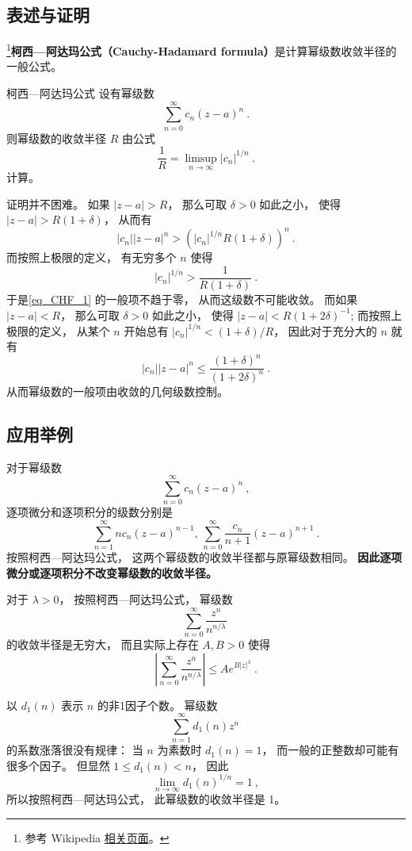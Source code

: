 

\subsection{表述与证明}

\footnote{参考 Wikipedia \href{https://en.wikipedia.org/wiki/Cauchy-Hadamard_theorem}{相关页面}。}\textbf{柯西—阿达玛公式（Cauchy-Hadamard formula）}是计算幂级数收敛半径的一般公式。

\begin{theorem}{柯西—阿达玛公式}
设有幂级数
\begin{equation}\label{eq_CHF_1}
\sum_{n=0}^\infty c_n(z-a)^n~.
\end{equation}
则幂级数的收敛半径 $R$ 由公式
$$
\frac{1}{R}=\limsup_{n\to\infty}|c_n|^{1/n}~.
$$
计算。
\end{theorem}
证明并不困难。 如果 $|z-a|>R$， 那么可取 $\delta>0$ 如此之小， 使得 $|z-a|>R(1+\delta)$， 从而有
$$
|c_n||z-a|^n>(|c_n|^{1/n}R(1+\delta))^n~.
$$
而按照上极限的定义， 有无穷多个 $n$ 使得
$$
|c_n|^{1/n}>\frac{1}{R(1+\delta)}~.
$$
于是\autoref{eq_CHF_1} 的一般项不趋于零， 从而这级数不可能收敛。 而如果 $|z-a|<R$， 那么可取 $\delta>0$ 如此之小， 使得 $|z-a|<R(1+2\delta)^{-1}$; 而按照上极限的定义， 从某个 $n$ 开始总有 $|c_n|^{1/n}<(1+\delta)/R$， 因此对于充分大的 $n$ 就有
$$
|c_n||z-a|^n\leq\frac{(1+\delta)^n}{(1+2\delta)^n}~.
$$
从而幂级数的一般项由收敛的几何级数控制。

\subsection{应用举例}
对于幂级数
$$
\sum_{n=0}^\infty c_n(z-a)^n~,
$$
逐项微分和逐项积分的级数分别是
$$
\sum_{n=1}^\infty nc_n(z-a)^{n-1},\,
\sum_{n=0}^\infty \frac{c_n}{n+1}(z-a)^{n+1}~.
$$
按照柯西—阿达玛公式， 这两个幂级数的收敛半径都与原幂级数相同。 \textbf{因此逐项微分或逐项积分不改变幂级数的收敛半径。}

对于 $\lambda>0$， 按照柯西—阿达玛公式， 幂级数
$$
\sum_{n=0}^\infty\frac{z^n}{n^{n/\lambda}}~
$$
的收敛半径是无穷大， 而且实际上存在 $A,B>0$ 使得
$$
\left|\sum_{n=0}^\infty\frac{z^n}{n^{n/\lambda}}\right|
\leq Ae^{B|z|^\lambda}~.
$$

以 $d_1(n)$ 表示 $n$ 的非1因子个数。 幂级数
$$
\sum_{n=1}^\infty d_1(n)z^n~
$$
的系数涨落很没有规律： 当 $n$ 为素数时 $d_1(n)=1$， 而一般的正整数却可能有很多个因子。 但显然 $1\leq d_1(n)<n$， 因此
$$
\lim_{n\to\infty}d_1(n)^{1/n}=1~,
$$
所以按照柯西—阿达玛公式， 此幂级数的收敛半径是 1。

